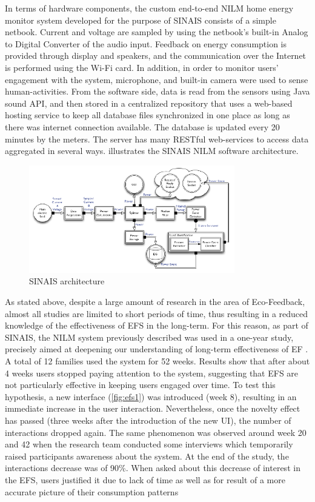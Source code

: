  In terms of hardware components, the custom end-to-end \ac{NILM} home energy monitor system developed for the purpose of \ac{SINAIS} consists of a simple netbook. Current and voltage are sampled by using the netbook’s built-in Analog to Digital Converter of the audio input. Feedback on energy consumption is provided through display and speakers, and the communication over the Internet is performed using the Wi-Fi card. In addition, in order to monitor users’ engagement with the system, microphone, and built-in camera were used to sense human-activities.  From the software side, data is read from the sensors using Java sound \ac{API}, and then stored in a centralized repository that uses a web-based hosting service to keep all database files synchronized in one place as long as there was internet connection available. The database is updated every 20 minutes by the meters. The server has many RESTful web-services to access data aggregated in several ways.   illustrates the SINAIS NILM software architecture.
 
 \begin{figure}[h]
\centering
\includegraphics[width=0.8\textwidth]{./Images/sinais}
\caption{\ac{SINAIS} architecture}
\label{fig:sinais}
\end{figure}


As stated above, despite a large amount of research in the area of Eco-Feedback, almost all studies are limited to short periods of time, thus resulting in a reduced knowledge of the effectiveness of \ac{EFS} in the long-term. For this reason, as part of \ac{SINAIS}, the \ac{NILM} system previously described was used in a one-year study, precisely aimed at deepening our understanding of long-term effectiveness of \ac{EF} \cite{Pereira2013}. A total of 12 families used the system for 52 weeks. Results show that after about 4 weeks users stopped paying attention to the system, suggesting that \ac{EFS} are not particularly effective in keeping users engaged over time. To test this hypothesis, a new interface (\cref{fig:efs1}) was introduced (week 8), resulting in an immediate increase in the user interaction. Nevertheless, once the novelty effect has passed (three weeks after the introduction of the new \ac{UI}), the number of interactions dropped again. The same phenomenon was observed around week 20 and 42 when the research team conducted some interviews which temporarily raised participants awareness about the system.
At the end of the study, the interactions decrease was of 90\%. When asked about this decrease of interest in the \ac{EFS}, users justified it due to lack of time as well as for result of a more accurate picture of their consumption patterns


